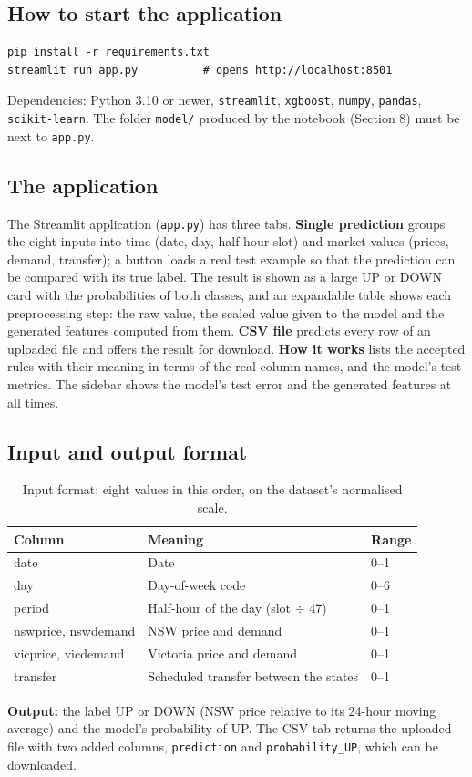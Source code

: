 \documentclass[11pt]{article}
\newcommand{\code}[1]{\texttt{#1}}
\begin{document}
\subsection{How to start the application}
\begin{lstlisting}
pip install -r requirements.txt
streamlit run app.py          # opens http://localhost:8501
\end{lstlisting}
Dependencies: Python 3.10 or newer, \code{streamlit}, \code{xgboost}, \code{numpy}, \code{pandas},
\code{scikit-learn}. The folder \code{model/} produced by the notebook (Section 8) must be next to
\code{app.py}.

\subsection{The application}
The Streamlit application (\code{app.py}) has three tabs. \textbf{Single prediction} groups the eight
inputs into time (date, day, half-hour slot) and market values (prices, demand, transfer); a button
loads a real test example so that the prediction can be compared with its true label. The result is
shown as a large UP or DOWN card with the probabilities of both classes, and an expandable table
shows each preprocessing step: the raw value, the scaled value given to the model and the generated
features computed from them. \textbf{CSV file} predicts every row of an uploaded file and offers the
result for download. \textbf{How it works} lists the accepted rules with their meaning in terms of
the real column names, and the model's test metrics. The sidebar shows the model's test error and
the generated features at all times.

\subsection{Input and output format}
\begin{table}[H]
\centering
\caption{Input format: eight values in this order, on the dataset's normalised scale.}
\label{tab:io}
\begin{tabular}{@{}lll@{}}
\toprule
Column & Meaning & Range \\
\midrule
date & Date & 0--1 \\
day & Day-of-week code & 0--6 \\
period & Half-hour of the day (slot $\div$ 47) & 0--1 \\
nswprice, nswdemand & NSW price and demand & 0--1 \\
vicprice, vicdemand & Victoria price and demand & 0--1 \\
transfer & Scheduled transfer between the states & 0--1 \\
\bottomrule
\end{tabular}
\end{table}
\textbf{Output:} the label UP or DOWN (NSW price relative to its 24-hour moving average) and the
model's probability of UP. The CSV tab returns the uploaded file with two added columns,
\code{prediction} and \code{probability\_UP}, which can be downloaded.
\end{document}
